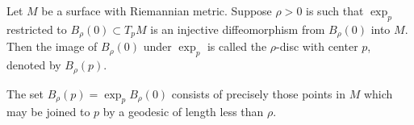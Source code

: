 Let $M$ be a surface with Riemannian metric. Suppose $\rho > 0$ is such that $\exp_p$ restricted to $B_\rho(0) \subset T_p M$ is an injective diffeomorphism from $B_\rho(0)$ into $M$. Then the image of $B_\rho(0)$ under $\exp_p$ is called the $\rho$-disc with center $p$, denoted by $B_\rho(p)$.

The set $B_\rho(p) = \exp_p B_\rho(0)$ consists of precisely those points in $M$ which may be joined to $p$ by a geodesic of length less than $\rho$.
